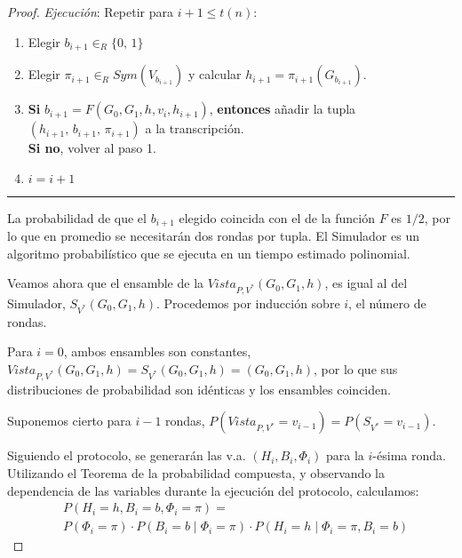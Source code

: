 \begin{proof}
	\textit{Ejecución}: Repetir para $i+1 \leq t(n)$:
	
	\begin{enumerate}
		\item Elegir $b_{i+1} \in_R \{0,\,1\}$
		
		\item Elegir $\pi_{i+1} \in_R Sym(V_{b_{i+1}})$ y calcular $h_{i+1}=\pi_{i+1}(G_{b_{i+1}})$.
		
		\item \textbf{Si} $b_{i+1} = F(G_0,G_1,h,v_i,h_{i+1})$, \textbf{entonces} añadir la tupla \\ $(h_{i+1},\,b_{i+1},\,\pi_{i+1})$ a la transcripción. \\
		\textbf{Si no}, volver al paso 1.
		
		\item $i = i+1$
		
	\end{enumerate}
	
	\rule{\textwidth}{1pt}
	
	\hfill
	
	
	La probabilidad de que el $b_{i+1}$ elegido coincida con el de la función $F$ es $1/2$, por lo que en promedio se necesitarán dos rondas por tupla. El Simulador es un algoritmo probabilístico que se ejecuta en un tiempo estimado polinomial.
	
	\hfil
	
	Veamos ahora que el ensamble de la $Vista_{P,V^*}(G_0, G_1 ,h)$, es igual al del Simulador, $S_{V^*}(G_0, G_1 ,h)$. Procedemos por inducción sobre $i$, el número de rondas.
	
	Para $i=0$, ambos ensambles son constantes, $Vista_{P,V^*}(G_0, G_1 ,h) = S_{V^*}(G_0, G_1 ,h) = (G_0, G_1, h)$, por lo que sus distribuciones de probabilidad son idénticas y los ensambles coinciden.
	
	Suponemos cierto para $i-1$ rondas, $P(Vista_{P,V^*}=v_{i-1}) = P(S_{V^*}=v_{i-1})$.
	
	\hfil
	
	Siguiendo el protocolo, se generarán las v.a. $(H_i, B_i, \Phi_i)$ para la $i$-ésima ronda. Utilizando el Teorema de la probabilidad compuesta, y observando la dependencia de las variables durante la ejecución del protocolo, calculamos:
	\begin{align*}
	& P(H_i=h, B_i=b, \Phi_i = \pi) = \\
	& P(\Phi_i = \pi) \cdot P(B_i = b \mid \Phi_i = \pi) \cdot P(H_i = h \mid \Phi_i = \pi, B_i=b)
	\end{align*}


\end{proof}
